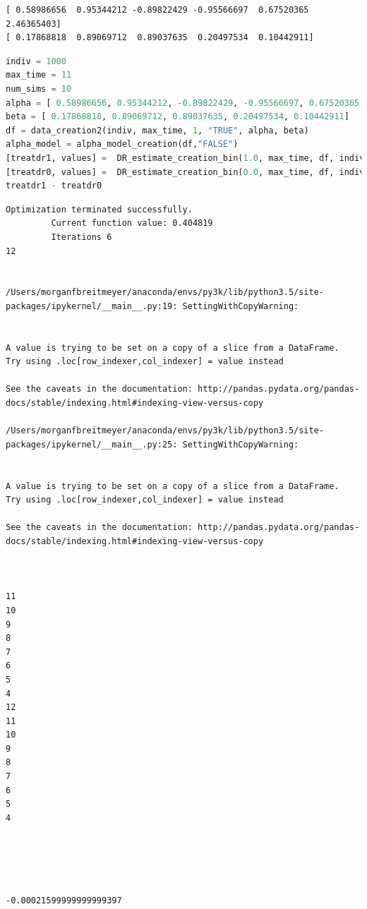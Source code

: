 \begin{lstlisting}
[ 0.58986656  0.95344212 -0.89822429 -0.95566697  0.67520365  2.46365403]
[ 0.17868818  0.89069712  0.89037635  0.20497534  0.10442911]
\end{lstlisting}

\begin{lstlisting}[language=Python]
indiv = 1000 
max_time = 11
num_sims = 10
alpha = [ 0.58986656, 0.95344212, -0.89822429, -0.95566697, 0.67520365, 2.46365403]
beta = [ 0.17868818, 0.89069712, 0.89037635, 0.20497534, 0.10442911]
df = data_creation2(indiv, max_time, 1, "TRUE", alpha, beta) 
alpha_model = alpha_model_creation(df,"FALSE")
[treatdr1, values] =  DR_estimate_creation_bin(1.0, max_time, df, indiv, "FALSE", "FALSE", alpha_model)
[treatdr0, values] =  DR_estimate_creation_bin(0.0, max_time, df, indiv, "FALSE", "FALSE", alpha_model)
treatdr1 - treatdr0
\end{lstlisting}

\begin{lstlisting}
Optimization terminated successfully.
         Current function value: 0.404819
         Iterations 6
12


/Users/morganfbreitmeyer/anaconda/envs/py3k/lib/python3.5/site-packages/ipykernel/__main__.py:19: SettingWithCopyWarning:


A value is trying to be set on a copy of a slice from a DataFrame.
Try using .loc[row_indexer,col_indexer] = value instead

See the caveats in the documentation: http://pandas.pydata.org/pandas-docs/stable/indexing.html#indexing-view-versus-copy

/Users/morganfbreitmeyer/anaconda/envs/py3k/lib/python3.5/site-packages/ipykernel/__main__.py:25: SettingWithCopyWarning:


A value is trying to be set on a copy of a slice from a DataFrame.
Try using .loc[row_indexer,col_indexer] = value instead

See the caveats in the documentation: http://pandas.pydata.org/pandas-docs/stable/indexing.html#indexing-view-versus-copy



11
10
9
8
7
6
5
4
12
11
10
9
8
7
6
5
4





-0.00021599999999999397
\end{lstlisting}

